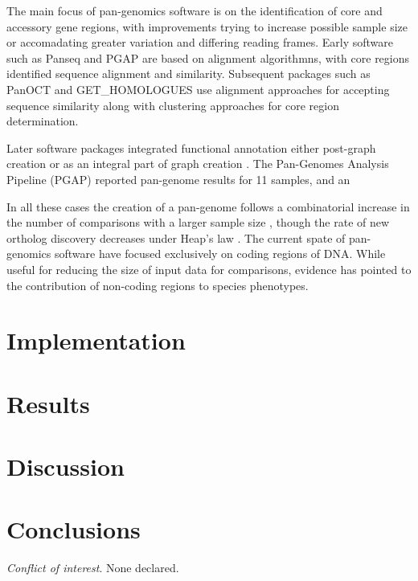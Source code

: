 \documentclass{article}
\begin{document}
The main focus of pan-genomics software is on the identification of core and accessory gene regions, with improvements trying to increase possible sample size or accomadating greater variation and differing reading frames.
Early software such as Panseq \cite{laing2010pan} and PGAP \cite{zhao2011pgap} are based on alignment algorithmns, with core regions identified sequence alignment and similarity.
Subsequent packages such as PanOCT \cite{fouts2012panoct} and GET_HOMOLOGUES \cite{contreras2013get_homologues} use alignment approaches for accepting sequence similarity along with clustering approaches for core region determination.

Later software packages integrated functional annotation either post-graph creation \cite{zhao2011pgap} or as an integral part of graph creation \cite{page2015roary}.
The Pan-Genomes Analysis Pipeline (PGAP) \cite{zhao2011pgap} reported pan-genome results for 11 samples, and an 


In all these cases the creation of a pan-genome follows a combinatorial increase in the number of comparisons with a larger sample size \cite{vernikos2015ten}, though the rate of new ortholog discovery decreases under Heap's law \cite{tettelin2008comparative}.
The current spate of pan-genomics software have focused exclusively on coding regions of DNA.
While useful for reducing the size of input data for comparisons, evidence \cite{} has pointed to the contribution of non-coding regions to species phenotypes.


\section{Implementation}

\section{Results}

\section{Discussion}


\section{Conclusions}


\textit{Conflict of interest}. None declared.

\newpage



\end{document}
